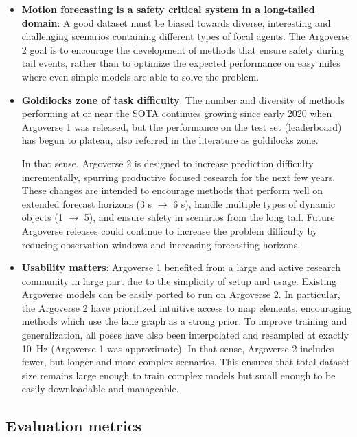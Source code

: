 \begin{itemize}
	
	\item \textbf{Motion forecasting is a safety critical system in a long-tailed domain}: A good dataset must be biased towards diverse, interesting and challenging scenarios containing different types of focal agents. The Argoverse 2 goal is to encourage the development of methods that ensure safety during tail events, rather than to optimize the expected performance on easy miles where even simple models are able to solve the problem.
	
	\item \textbf{Goldilocks zone of task difficulty}: The number and diversity of methods performing at or near the \ac{SOTA} continues growing since early 2020 when Argoverse 1 was released, but the performance on the test set (leaderboard) has begun to plateau, also referred in the literature as goldilocks zone.

	In that sense, Argoverse 2 is designed to increase prediction difficulty incrementally, spurring productive focused research for the next few years. These changes are intended to encourage methods that perform well on extended forecast horizons (3 s $\rightarrow$ 6 s), handle multiple types of dynamic objects (1 $\rightarrow$ 5), and ensure safety in scenarios from the long tail. Future Argoverse releases could continue to increase the problem difficulty by reducing observation windows and increasing forecasting horizons.
	
	\item \textbf{Usability matters}: Argoverse 1 benefited from a large and active research community in large part due to the simplicity of setup and usage. Existing Argoverse models can be easily ported to run on Argoverse 2. In particular, the Argoverse 2 have prioritized intuitive access to map elements,  encouraging methods which use the lane graph as a strong prior. To improve training and generalization, all poses have also been interpolated and resampled at exactly \SI{10}{\hertz} (Argoverse 1 was approximate). In that sense, Argoverse 2 includes fewer, but longer and more complex scenarios. This ensures that total dataset size remains large enough to train complex models but small enough to be easily downloadable and manageable.
	
\end{itemize}

\subsection{Evaluation metrics}
\label{subsec:2_evaluation_metrics}

